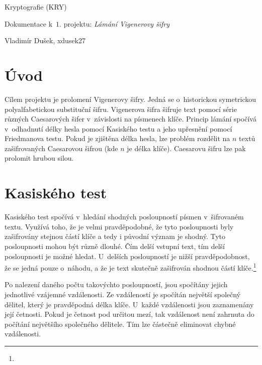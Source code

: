 \documentclass[11pt, a4paper, titlepage]{article}
\begin{document}

\begin{center}
    \Large Kryptografie (KRY)
    \bigskip

    \Large Dokumentace k~$1.$ projektu: \textit{Lámání Vigenerovy šifry}
    \bigskip

    \Large Vladimír Dušek, xdusek27
    \bigskip
\end{center}


\section{Úvod}\label{sec_intro}

Cílem projektu je prolomení Vigenerovy šifry.
Jedná se o~historickou symetrickou polyalfabetickou substituční šifru.
Vigenerova šifra šifruje text pomocí série různých Caesarových šifer v~závislosti na písmenech klíče.
Princip lámání spočívá v~odhadnutí délky hesla pomocí Kasiského testu
a jeho upřesnění pomocí Friedmanova testu.
Pokud je zjištěna délka hesla, lze problém rozdělit na $n$ textů zašifrovaných Caesarovou šifrou
(kde $n$ je délka klíče).
Caesarovu šifru lze pak prolomit hrubou silou.


\section{Kasiského test}\label{sec_kasiski}

Kasiského test spočívá v~hledání shodných posloupností písmen v~šifrovaném textu.
Využívá toho, že je velmi pravděpodobné, že tyto posloupnosti byly zašifrovány stejnou částí klíče
a tedy i původní význam je shodný.
Tyto posloupnosti mohou být různě dlouhé.
Čím delší vstupní text, tím delší posloupnosti je možné hledat.
U~delších posloupností je nižší pravděpodobnost, že se jedná pouze o~náhodu, a že je text skutečně
zašifrován shodnou částí klíče.\footnote{}

Po nalezení daného počtu takovýchto posloupností,
jsou spočítány jejich jednotlivé vzájemné vzdálenosti.
Ze vzdáleností je spočítán největší společný dělitel, který je pravděpodná délka klíče.
U~každé vzdálenosti jsou zaznamenány její četnosti.
Pokud je četnost pod určitou mezí, tak vzdálenost není zahrnuta
do počítání největšího společného dělitele.
Tím lze částečně eliminovat chybné vzdálenosti.
\end{document}
